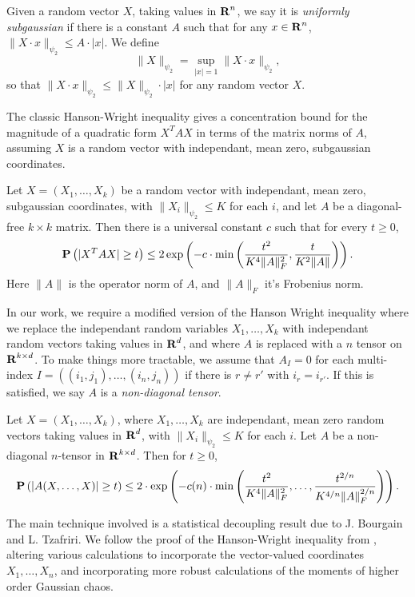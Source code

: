 Given a random vector $X$, taking values in $\operatorname{\mathbf{R}}^n$, we say it is \emph{uniformly subgaussian} if there is a constant $A$ such that for any $x \in \operatorname{\mathbf{R}}^n$, $\| X \cdot x \|_{\psi_2} \leq A \cdot |x|$. We define
%
\[ \| X \|_{\psi_2} = \sup_{|x| = 1} \| X \cdot x \|_{\psi_2}, \]
%
so that $\| X \cdot x \|_{\psi_2} \leq \| X \|_{\psi_2} \cdot |x|$ for any random vector $X$.

The classic Hanson-Wright inequality gives a concentration bound for the magnitude of a quadratic form $X^T A X$ in terms of the matrix norms of $A$, assuming $X$ is a random vector with independant, mean zero, subgaussian coordinates.

\begin{theorem}
	Let $X = (X_1, \dots, X_k)$ be a random vector with independant, mean zero, subgaussian coordinates, with $\| X_i \|_{\psi_2} \leq K$ for each $i$, and let $A$ be a diagonal-free $k \times k$ matrix. Then there is a universal constant $c$ such that for every $t \geq 0$,
	\[ \operatorname{\mathbf{P}} \left( |X^TAX| \geq t \right) \leq 2 \exp \left( -c \cdot \min \left( \frac{t^2}{K^4 \| A \|_F^2}, \frac{t}{K^2 \| A \|} \right) \right). \]
	Here $\| A \|$ is the operator norm of $A$, and $\| A \|_F$ it's Frobenius norm.
\end{theorem}

In our work, we require a modified version of the Hanson Wright inequality where we replace the independant random variables $X_1, \dots, X_k$ with independant random vectors taking values in $\operatorname{\mathbf{R}}^d$, and where $A$ is replaced with a $n$ tensor on $\operatorname{\mathbf{R}}^{k \times d}$. To make things more tractable, we assume that $A_I = 0$ for each multi-index $I = ((i_1,j_1), \dots, (i_n,j_n))$ if there is $r \neq r'$ with $i_r = i_{r'}$. If this is satisfied, we say $A$ is a \emph{non-diagonal tensor}.

\begin{theorem}
	Let $X = (X_1, \dots, X_k)$, where $X_1, \dots, X_k$ are independant, mean zero random vectors taking values in $\operatorname{\mathbf{R}}^d$, with $\| X_i \|_{\psi_2} \leq K$ for each $i$. Let $A$ be a non-diagonal $n$-tensor in $\operatorname{\mathbf{R}}^{k \times d}$. Then for $t \geq 0$,
	\[ \operatorname{\mathbf{P}} \left( |A(X,\dots,X)| \geq t \right) \leq 2 \cdot \exp \left( - c(n) \cdot \min \left( \frac{t^2}{K^4 \| A \|_F^2}, \dots, \frac{t^{2/n}}{K^{4/n} \| A \|_F^{2/n}} \right) \right). \]
\end{theorem}

The main technique involved is a statistical decoupling result due to J. Bourgain and L. Tzafriri. We follow the proof of the Hanson-Wright inequality from \cite{Vershynin}, altering various calculations to incorporate the vector-valued coordinates $X_1, \dots, X_n$, and incorporating more robust calculations of the moments of higher order Gaussian chaos.

